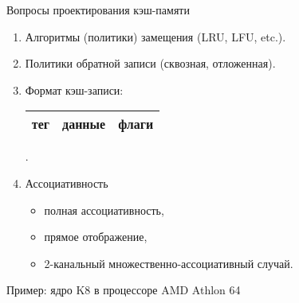 \begin{frame}{Вопросы проектирования кэш-памяти}
\begin{enumerate}[<+->]\itemsep=.5cm
    \item Алгоритмы (политики) замещения (LRU, LFU, etc.).
    \item Политики обратной записи (сквозная, отложенная).
    \item Формат кэш-записи:
    \begin{tabular}{|c|c|c|}
    \hline
    тег & данные & флаги\\
    \hline
    \end{tabular}.
    \item Ассоциативность
    \begin{itemize}
        \item полная ассоциативность,
        \item прямое отображение,
        \item 2-канальный множественно-ассоциативный случай.
    \end{itemize}
\end{enumerate}
\end{frame}

\begin{frame}{Пример: ядро K8 в процессоре AMD Athlon 64}
\end{frame}



